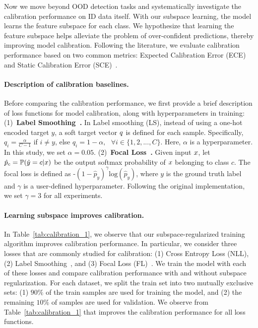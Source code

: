 

\noindent Now we move beyond OOD detection tasks and systematically investigate the calibration performance on ID data itself. With our subspace learning, the model learns the feature subspace for each class. We hypothesize that learning the feature subspace helps alleviate the problem of over-confident predictions, thereby improving model calibration. Following the literature, we evaluate calibration performance based on two common metrics: {Expected Calibration Error (ECE)}~\cite{naeini2015obtaining} and  {Static Calibration Error (SCE)}~\cite{nixon2019measuring}. 

\paragraph{Description of calibration baselines.}

Before comparing the calibration performance, we first provide a brief description of loss functions for model calibration, along with hyperparameters in training: (1)~\textbf{Label Smoothing~\cite{muller2019does}.} In Label smoothing (LS), instead of using a one-hot encoded target $y$, a soft target vector $\*q$ is defined for each sample. Specifically, $q_i = \frac{\alpha}{C-1}$ if $i \neq y$, else $q_i = 1-\alpha, ~~~\forall i \in \{1,2,...,C\}$. Here, $\alpha$ is a hyperparameter. In this study, we set $\alpha = 0.05$. (2)~\textbf{Focal Loss~\cite{lin2017focal, mukhoti2020calibrating}.} Given input $\*x$, let $\hat{p}_c = \mathbb{P}(\hat{y}=c|\*x)$ be the output softmax probability of $\*x$ belonging to class $c$. The focal loss is defined as -$(1 - \hat{p}_y)^{\gamma}\text{log}(\hat{p}_y)$, where $y$ is the ground truth label and $\gamma$ is a user-defined hyperparameter. Following the original implementation, we set $\gamma=3$ for all experiments. 


\paragraph{Learning subspace improves calibration.} 
In Table~\ref{tab:calibration_1}, we observe that our subspace-regularized training algorithm improves calibration performance. In particular, we consider three losses that are commonly studied for calibration: (1) Cross Entropy Loss (NLL), (2) Label Smoothing~\cite{muller2019does}, and (3) Focal Loss (FL)~\cite{lin2017focal}.  We train the model with each of these losses and compare calibration performance with and without subspace regularization. For each dataset, we split the train set into two mutually exclusive sets: (1) $90\%$ of the train samples are used for training the model, and (2) the remaining $10\%$ of samples are used for validation. We observe from Table~\ref{tab:calibration_1} that \name improves the calibration performance for all loss functions.

